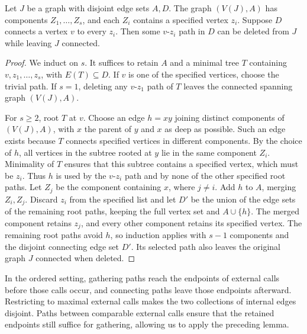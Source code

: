 \documentclass[USenglish, a4paper, thm-restate,numberwithinsect, cleveref]{lipics-v2021}
\begin{document}
\begin{lemma}\label{lem:characterization-static-selection}
Let $J$ be a graph with disjoint edge sets $A,D$. The graph
$(V(J),A)$ has components $Z_1,\ldots,Z_s$, and each $Z_i$ contains
a specified vertex $z_i$. Suppose $D$ connects a vertex $v$ to every
$z_i$. Then some $v$-$z_i$ path in $D$ can be deleted from $J$
while leaving $J$ connected.
\end{lemma}
\begin{proof}
We induct on $s$. It suffices to retain $A$ and a minimal tree $T$
containing $v,z_1,\ldots,z_s$, with $E(T)\subseteq D$.
If $v$ is one of the specified vertices, choose
the trivial path. If $s=1$, deleting any $v$-$z_1$ path of $T$
leaves the connected spanning graph $(V(J),A)$.

For $s\ge2$, root $T$ at $v$. Choose an edge $h=xy$ joining
distinct components of $(V(J),A)$, with $x$ the parent of $y$ and
$x$ as deep as possible. Such an edge exists because $T$ connects
specified vertices in different components. By the choice of $h$,
all vertices in the subtree rooted at $y$ lie in the same component
$Z_i$. Minimality of $T$ ensures that this subtree contains a specified
vertex, which must be $z_i$. Thus $h$ is used by the $v$-$z_i$ path
and by none of the other specified root paths. Let $Z_j$ be the
component containing $x$, where $j\ne i$. Add $h$ to $A$, merging
$Z_i,Z_j$.
Discard $z_i$ from the specified list and let $D'$ be the union of
the edge sets of the remaining root paths, keeping the full vertex set and
$A\cup\{h\}$. The merged component retains $z_j$, and every other
component retains its specified vertex. The remaining root paths
avoid $h$, so induction applies with $s-1$ components and the
disjoint connecting edge set $D'$. Its selected path also leaves the original
graph $J$ connected when deleted.
\end{proof}

In the ordered setting, gathering paths reach the endpoints of
external calls before those calls occur, and connecting paths leave
those endpoints afterward. Restricting to maximal external calls
makes the two collections of internal edges disjoint. Paths between
comparable external calls ensure that the retained endpoints still
suffice for gathering, allowing us to apply the preceding lemma.
\end{document}
